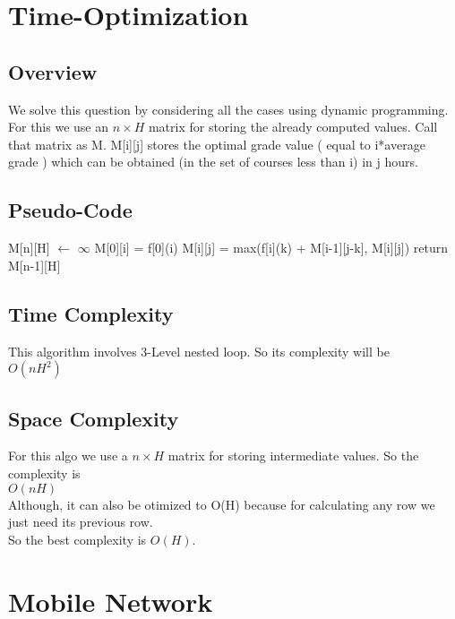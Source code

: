 \documentclass{article}
\begin{document}
\newpage
\section{Time-Optimization}
\subsection{Overview}
We solve this question by considering all the cases using dynamic programming. For this we use an $n\times H$ matrix for storing the already computed
values. Call that matrix as M.
M[i][j] stores the optimal grade value ( equal to i*average grade ) which can be obtained (in the set of courses less than i) in j hours. 

\subsection{Pseudo-Code}
\begin{algorithmic}[1]
  \State M[n][H] $\gets$ $\infty$
  \State M[0][i] = f[0](i) 
  \EndFor
  \State M[i][j] = max(f[i](k) + M[i-1][j-k], M[i][j]) 
  \EndFor
  \EndFor
  \EndFor
  \State return M[n-1][H] 
  \EndProcedure 
\end{algorithmic}

\subsection{Time Complexity}
This algorithm involves 3-Level nested loop. So its complexity will be \\
\hspace*{2cm}$O(nH^2)$

\subsection{Space Complexity}
For this algo we use a $n \times H$ matrix for storing intermediate values. So the complexity is   \\
\hspace*{2cm}$O(nH)$  \\
Although, it can also be otimized to O(H) because for calculating any row we just need its previous row.\\
So the best complexity is $O(H)$.

\newpage
\section{Mobile Network}
\end{document}
